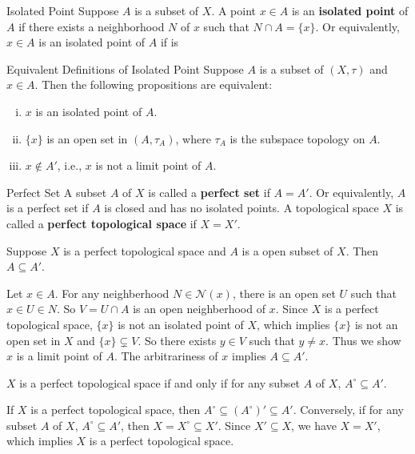 \documentclass{report}
\begin{document}
\begin{definition}{Isolated Point}{}
	Suppose $A$ is a subset of $X$. A point $x\in A$ is an \textbf{isolated point} of $A$ if there exists a neighborhood $N$ of $x$ such that $N\cap A=\{x\}$. Or equivalently, $x\in A$ is an isolated point of $A$ if is
\end{definition}
\begin{proposition}{Equivalent Definitions of Isolated Point}{}
	Suppose $A$ is a subset of $(X,\tau)$ and $x\in A$. Then the following propositions are equivalent:
	\begin{enumerate}[(i)]
		\item $x$ is an isolated point of $A$.
		\item $\{x\}$ is an open set in $(A,\tau_A)$, where $\tau_A$ is the subspace topology on $A$.
		\item $x\notin A'$, i.e., $x$ is not a limit point of $A$.
	\end{enumerate}
\end{proposition}

\begin{definition}
	{Perfect Set}{}
	A subset $A$ of $X$ is called a \textbf{perfect set} if $A=A'$. Or equivalently, $A$ is a perfect set if $A$ is closed and has no isolated points. A topological space $X$ is called a \textbf{perfect topological space} if $X=X'$.
\end{definition}

\begin{proposition}{}{}
	Suppose $X$ is a perfect topological space and $A$ is a open subset of $X$. Then $A\subseteq A'$.
\end{proposition}

\begin{prf}
	Let $x\in A$. For any neighberhood $N\in\mathcal{N}(x)$, there is an open set $U$ such that $x\in U \in N$. So $V=U\cap A$ is an open neighberhood of $x$. Since $X$ is a perfect topological space, $\{x\}$ is not an isolated point of $X$, which implies $\{x\}$ is not an open set in $X$ and $\{x\}\subsetneq V$. So there exists $y\in V$ such that $y\ne x$. Thus we show $x$ is a limit point of $A$. The arbitrariness of $x$ implies $A\subseteq A'$.
\end{prf}

\begin{corollary}{}{}
	$X$ is a perfect topological space if and only if for any subset $A$ of $X$, $A^\circ\subseteq A'$.
\end{corollary}
\begin{prf}
	If $X$ is a perfect topological space, then $A^\circ\subseteq (A^\circ)'\subseteq A'$. Conversely, if for any subset $A$ of $X$, $A^\circ\subseteq A'$, then $X=X^\circ\subseteq X'$. Since $X'\subseteq X$, we have $X=X'$, which implies $X$ is a perfect topological space.
\end{prf}
\end{document}
